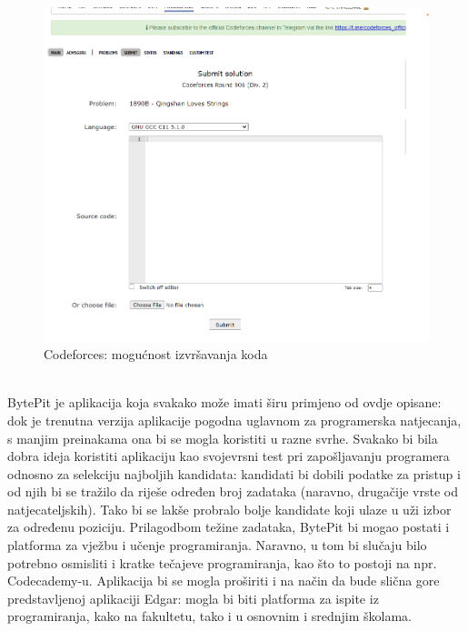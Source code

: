 		\begin{figure}[H]
			\includegraphics[scale=0.4]{slike/cf2}
			\centering
			\caption{Codeforces: mogućnost izvršavanja koda}
			\label{fig:run}
		\end{figure}
		
		\noindent\\
		BytePit je aplikacija koja svakako može imati širu primjeno od ovdje opisane: dok je trenutna verzija aplikacije pogodna uglavnom za programerska natjecanja, s manjim preinakama ona bi se mogla koristiti u razne svrhe. Svakako bi bila dobra ideja koristiti aplikaciju kao svojevrsni test pri zapošljavanju programera odnosno za selekciju najboljih kandidata: kandidati bi dobili podatke za pristup i od njih bi se tražilo da riješe određen broj zadataka (naravno, drugačije vrste od natjecateljskih). Tako bi se lakše probralo bolje kandidate koji ulaze u uži izbor za određenu poziciju. Prilagodbom težine zadataka, BytePit bi mogao postati i platforma za vježbu i učenje programiranja. Naravno, u tom bi slučaju bilo potrebno osmisliti i kratke tečajeve programiranja, kao što to postoji na npr. Codecademy-u.
		Aplikacija bi se mogla proširiti i na način da bude slična gore predstavljenoj aplikaciji Edgar: mogla bi biti platforma za ispite iz programiranja, kako na fakultetu, tako i u osnovnim i srednjim školama.\\
		
		\eject

